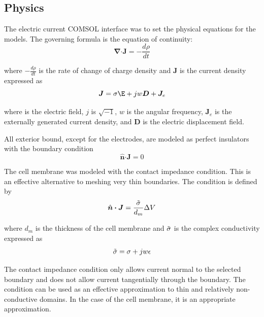 \subsection*{Physics}
\par The electric current COMSOL interface was to set the physical equations for the models. The governing formula is the equation of continuity:
\begin{equation}
    \boldsymbol\nabla \boldsymbol\cdot \boldsymbol J = -\frac{d\rho}{dt}
\end{equation}

where $-\frac{d\rho}{dt}$ is the rate of change of charge density and $\boldsymbol J$ is the current density expressed as
\begin{equation}
    \boldsymbol J = \sigma\boldsymbol\E + jw\boldsymbol D + \boldsymbol J_e
\end{equation}

where \boldsymbol\E is the electric field, $j$ is $\sqrt{-1}$, $w$ is the angular frequency, $\boldsymbol J_e$ is the externally generated current density, and $\boldsymbol D$ is the electric displacement field. 

\par All exterior bound, except for the electrodes, are modeled as perfect insulators with the boundary condition
\begin{equation}
    \hat{\boldsymbol n} \boldsymbol\cdot \boldsymbol J = 0
\end{equation}

\par The cell membrane was modeled with the contact impedance condition. This is an effective alternative to meshing very thin boundaries. The condition is defined by
\begin{equation}
    \hat{\boldsymbol n} \boldsymbol\cdot \boldsymbol J = \frac{\Tilde{\sigma}}{d_{m}} \Delta V
\end{equation}

where $d_m$ is the thickness of the cell membrane and $\Tilde{\sigma}$ is the complex conductivity expressed as
\begin{equation}
    \Tilde{\sigma} = \sigma + jw\epsilon 
\end{equation}

\par The contact impedance condition only allows current normal to the selected boundary and does not allow current tangentially through the boundary. The condition can be used as an effective approximation to thin and relatively non-conductive domains. In the case of the cell membrane, it is an appropriate approximation. 

